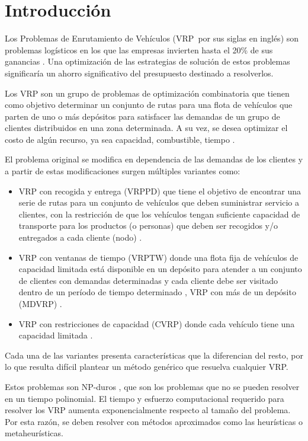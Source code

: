 \chapter*{Introducción}\label{chapter:introduction}

\qquad 
Los Problemas de Enrutamiento de Vehículos (VRP~por sus siglas en inglés) son problemas logísticos en los que las empresas invierten hasta el 20\% de sus ganancias \cite{Toth}. Una optimización de las estrategias de solución de estos problemas significaría un ahorro significativo del presupuesto destinado a resolverlos. 

Los VRP son un grupo de problemas de optimización combinatoria que tienen como objetivo determinar un conjunto de rutas para una flota de vehículos que parten de uno o más depósitos para satisfacer las demandas de un grupo de clientes distribuidos en una zona determinada. A su vez, se desea optimizar el costo de algún recurso, ya sea capacidad, combustible, tiempo \cite{Hillier}.

El problema original se modifica en dependencia de las demandas de los clientes y a partir de estas modificaciones surgen múltiples variantes como: 
\begin{itemize}
	\item VRP con recogida y entrega (VRPPD) que tiene el objetivo de encontrar una serie de rutas para un conjunto de vehículos que deben suministrar servicio a clientes, con la restricción de que los vehículos tengan suficiente capacidad de transporte para los productos (o personas) que deben ser recogidos y/o entregados a cada cliente (nodo) \cite{PedroP}.

    \item VRP con ventanas de tiempo (VRPTW) donde una flota fija de vehículos de capacidad limitada está disponible en un depósito para atender a un conjunto de clientes con demandas determinadas y cada cliente debe ser visitado dentro de un período de tiempo determinado \cite{Kolen}, VRP con más de un depósito (MDVRP) \cite{Bayir, Alemany}. 
	\item VRP con restricciones de capacidad (CVRP) donde cada vehículo tiene una capacidad limitada \cite{Alemany}.
\end{itemize}
	Cada una de las variantes presenta características que la diferencian del resto, por lo que resulta difícil plantear un método genérico que resuelva cualquier VRP\@.

Estos problemas son NP-duros \cite{Garey}, que son los problemas que no se pueden resolver en un tiempo polinomial. El tiempo y esfuerzo computacional requerido para resolver los VRP aumenta exponencialmente respecto al tamaño del problema. Por esta razón, se deben resolver con métodos aproximados como las heurísticas o metaheurísticas.

